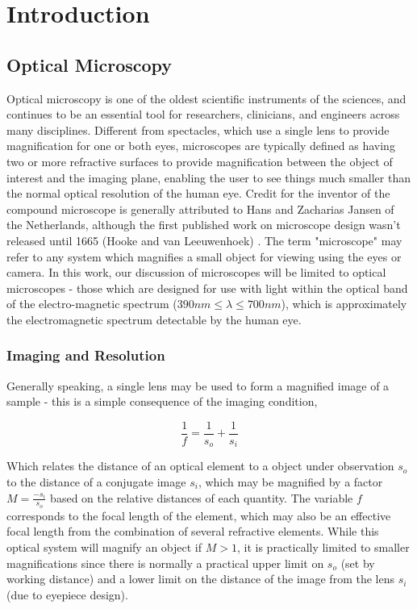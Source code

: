 \chapter{Introduction}

\section{Optical Microscopy}

Optical microscopy is one of the oldest scientific instruments of the sciences, and continues to be an essential tool for researchers, clinicians, and engineers across many disciplines. Different from spectacles, which use a single lens to provide magnification for one or both eyes, microscopes are typically defined as having two or more refractive surfaces to provide magnification between the object of interest and the imaging plane, enabling the user to see things much smaller than the normal optical resolution of the human eye. Credit for the inventor of the compound microscope is generally attributed to Hans and Zacharias Jansen of the Netherlands, although the first published work on microscope design wasn't released until 1665 (Hooke and van Leeuwenhoek) \cite{natureMilestones,hookeMicrographica}. The term "microscope" may refer to any system which magnifies a small object for viewing using the eyes or camera. In this work, our discussion of microscopes will be limited to optical microscopes - those which are designed for use with light within the optical band of the electro-magnetic spectrum ($390nm \leq \lambda \leq 700nm$), which is approximately the electromagnetic spectrum detectable by the human eye. 

\subsection{Imaging and Resolution}
Generally speaking, a single lens may be used to form a magnified image of a sample - this is a simple consequence of the imaging condition,

\begin{equation}
\frac{1}{f} = \frac{1}{s_o} + \frac{1}{s_i}
\end{equation}

Which relates the distance of an optical element to a object under observation $s_o$ to the distance of a conjugate image $s_i$, which may be magnified by a factor $M = \frac{-s_i}{s_o}$ based on the relative distances of each quantity. The variable $f$ corresponds to the focal length of the element, which may also be an effective focal length from the combination of several refractive elements. While this optical system will magnify an object if $M > 1$, it is practically limited to smaller magnifications since there is normally a practical upper limit on $s_o$ (set by working distance) and a lower limit on the distance of the image from the lens $s_i$ (due to eyepiece design). 


